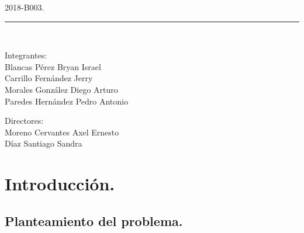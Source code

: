 \documentclass[12pt, a4paper, titlepage]{article}
\begin{document}
\begin{titlepage}
\begin{center}
			\begin{large}
				2018-B003.\\
			\end{large}
			
			\vspace*{0.2in}
			
			\rule{80mm}{.1mm}\\
			\vspace*{0.1in}
			
			\begin{large}
				\begin{center}
					Integrantes:\\
					Blancas Pérez Bryan Israel\\
					Carrillo Fernández Jerry\\
					Morales González Diego Arturo\\
					Paredes Hernández Pedro Antonio\\
				\end{center}
			\end{large}
			
			\begin{large}
				Directores:\\
				Moreno Cervantes Axel Ernesto\\
				Díaz Santiago Sandra\\
			\end{large}
			
		\end{center}
	
	\end{titlepage}

	\begin{appendix}
		\href{}{\renewcommand*\contentsname{{\textcolor{azulescom}{Índice.}}}}
		\tableofcontents
		\newpage
		\renewcommand*\listfigurename{{\textcolor{azulescom}{Índice de figuras.}}}
		\listoffigures
		\newpage
		\newpage
		\renewcommand*\listtablename{{\textcolor{azulescom}{Índice de cuadros.}}}
		\listoftables
	\end{appendix}
	\newpage
	

	\section{\textcolor{azulescom}{Introducción.}}
		\subsection{Planteamiento del problema.}
\end{document}

